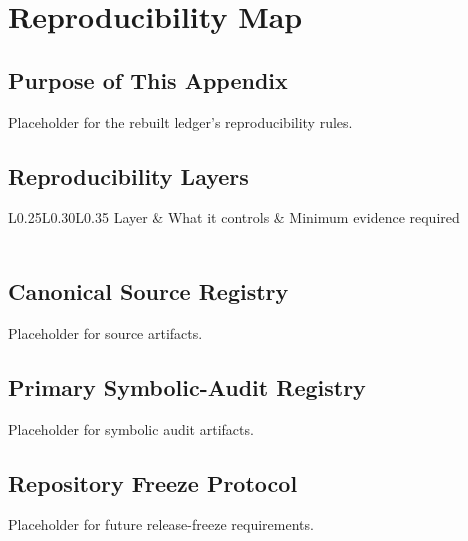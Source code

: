 \chapter{Reproducibility Map}
\label{app:reproducibility-map}
\def\ReproFile#1{\begingroup\footnotesize\nolinkurl{#1}\endgroup}

\section{Purpose of This Appendix}
\label{sec:reproducibility-purpose}

Placeholder for the rebuilt ledger's reproducibility rules.

\section{Reproducibility Layers}
\label{sec:reproducibility-layers}

\begin{longtable}{L{0.25\textwidth}L{0.30\textwidth}L{0.35\textwidth}}
\toprule
Layer & What it controls & Minimum evidence required \\
\midrule
\endhead
{} \\
\bottomrule
\end{longtable}

\section{Canonical Source Registry}
\label{sec:canonical-source-registry}

Placeholder for source artifacts.

\section{Primary Symbolic-Audit Registry}
\label{sec:primary-symbolic-audit-registry}

Placeholder for symbolic audit artifacts.

\section{Repository Freeze Protocol}
\label{sec:repository-freeze-protocol}

Placeholder for future release-freeze requirements.
